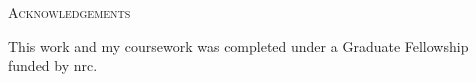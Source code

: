 \begin{center}
   {\LARGE\textsc{Acknowledgements}}

   This work and my coursework was completed under a Graduate Fellowship funded by \acf{nrc}. 
\end{center}

